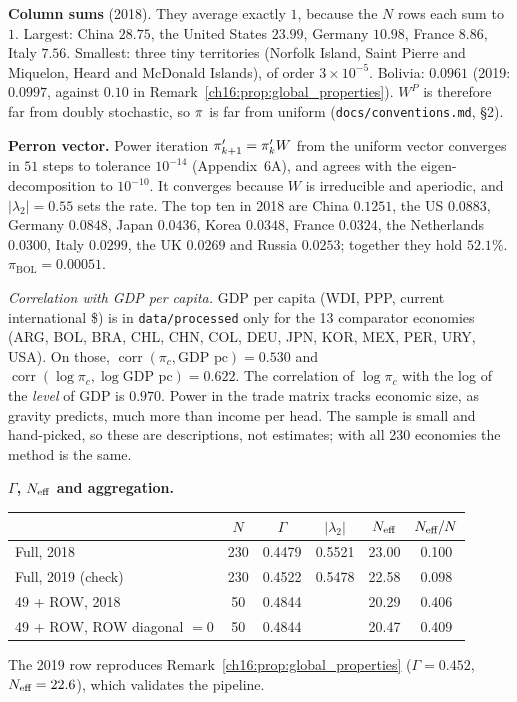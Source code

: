\documentclass[../solutions_manual.tex]{subfiles}
\begin{document}
 \textbf{Column sums} (2018). They average exactly $1$, because the $N$ rows each sum to $1$. Largest: China $28.75$, the United States $23.99$, Germany $10.98$, France $8.86$, Italy $7.56$. Smallest: three tiny territories (Norfolk Island, Saint Pierre and Miquelon, Heard and McDonald Islands), of order $3 \times 10^{-5}$. Bolivia: $0.0961$ (2019: $0.0997$, against $0.10$ in Remark~\ref{ch16:prop:global_properties}). $W^P$ is therefore far from doubly stochastic, so $\pi$ is far from uniform (\nolinkurl{docs/conventions.md}, \S2).

 \textbf{Perron vector.} Power iteration $\pi_{k+1}' = \pi_k'W$ from the uniform vector converges in $51$ steps to tolerance $10^{-14}$ (Appendix~6A), and agrees with the eigen-decomposition to $10^{-10}$. It converges because $W$ is irreducible and aperiodic, and $|\lambda_2| = 0.55$ sets the rate. The top ten in 2018 are China $0.1251$, the US $0.0883$, Germany $0.0848$, Japan $0.0436$, Korea $0.0348$, France $0.0324$, the Netherlands $0.0300$, Italy $0.0299$, the UK $0.0269$ and Russia $0.0253$; together they hold $52.1\%$. $\pi_{\text{BOL}} = 0.00051$.

\emph{Correlation with GDP per capita.} GDP per capita (WDI, PPP, current international \$) is in \nolinkurl{data/processed} only for the 13 comparator economies (ARG, BOL, BRA, CHL, CHN, COL, DEU, JPN, KOR, MEX, PER, URY, USA). On those, $\operatorname{corr}(\pi_c, \text{GDP pc}) = 0.530$ and $\operatorname{corr}(\log\pi_c, \log\text{GDP pc}) = 0.622$. The correlation of $\log\pi_c$ with the log of the \emph{level} of GDP is $0.970$. Power in the trade matrix tracks economic size, as gravity predicts, much more than income per head. The sample is small and hand-picked, so these are descriptions, not estimates; with all 230 economies the method is the same.

 \textbf{$\Gamma$, $N_{\text{eff}}$ and aggregation.}
\begin{center}
\begin{tabular}{lccccc}
\toprule
& $N$ & $\Gamma$ & $|\lambda_2|$ & $N_{\text{eff}}$ & $N_{\text{eff}}/N$ \\
\midrule
Full, 2018 & 230 & 0.4479 & 0.5521 & 23.00 & 0.100 \\
Full, 2019 (check) & 230 & 0.4522 & 0.5478 & 22.58 & 0.098 \\
49 + ROW, 2018 & 50 & 0.4844 & & 20.29 & 0.406 \\
49 + ROW, ROW diagonal $=0$ & 50 & 0.4844 & & 20.47 & 0.409 \\
\bottomrule
\end{tabular}
\end{center}
The 2019 row reproduces Remark~\ref{ch16:prop:global_properties} ($\Gamma = 0.452$, $N_{\text{eff}} = 22.6$), which validates the pipeline.
\end{document}
